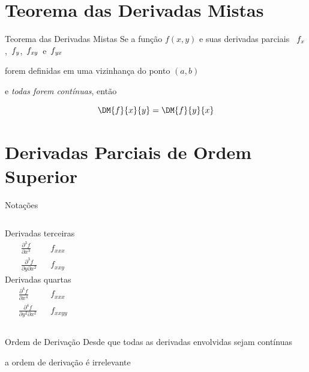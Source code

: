 \documentclass[fleqn,utf8,aspectratio=169,12pt]{beamer}
\begin{document}
\section{Teorema das Derivadas Mistas}

\begin{frame}{Teorema das Derivadas Mistas}
  Se a função \(f(x, y)\) e suas derivadas parciais
  \, $f_\emph{x}$,\, $f_\emph{y}$,\, $f_{\emph{xy}}$\, e \,$f_{\emph{yx}}$

  \pause
  forem definidas em uma vizinhança do ponto \((a, b)\)

  \pause
  e \emph{todas forem contínuas}, então

  \pause
  \[
    \DM{f}{x}{y} = \DM{f}{y}{x}
  \]
\end{frame}



\section{Derivadas Parciais de Ordem Superior}

\begin{frame}{Notações}
  \begin{columns}
    Derivadas terceiras
    \bigskip
    \begin{align*} &
      \frac{\partial^3 f}{\partial x^3} & &
      f_{xxx}
      \\[7mm] &
      \frac{\partial^3 f}{\partial y\partial x^2} & &
      f_{xxy}
    \end{align*}
    Derivadas quartas
    \bigskip
    \begin{align*} &
      \frac{\partial^4 f}{\partial x^4} & &
      f_{xxx}
      \\[7mm] &
      \frac{\partial^4 f}{\partial y^2 \partial x^2} & &
      f_{xxyy}
    \end{align*}
  \end{columns}
\end{frame}

\begin{frame}{Ordem de Derivação}
  Desde que todas as derivadas envolvidas sejam contínuas

  \pause
  a ordem de derivação é irrelevante
\end{frame}
\end{document}

